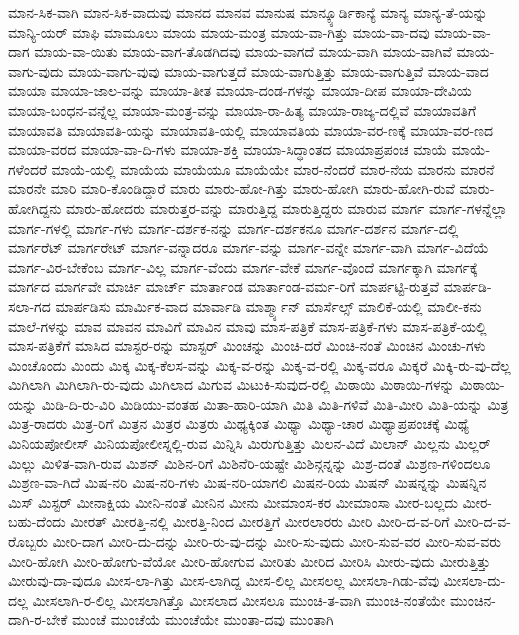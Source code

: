 {ಮಾನ-ಸಿಕ-ವಾಗಿ
ಮಾನ-ಸಿಕ-ವಾದುವು
ಮಾನದ
ಮಾನವ
ಮಾನುಷ
ಮಾನ್ಕ್ಯೂರ್ಡಿಕಾನ್ಯೆ
ಮಾನ್ಯ
ಮಾನ್ಯ-ತೆ-ಯನ್ನು
ಮಾನ್ಯಿ-ಯರ್
ಮಾಫಿ
ಮಾಮೂಲು
ಮಾಯ
ಮಾಯ-ಮಂತ್ರ
ಮಾಯ-ವಾ-ಗಿತ್ತು
ಮಾಯ-ವಾ-ದವು
ಮಾಯ-ವಾ-ದಾಗ
ಮಾಯ-ವಾ-ಯಿತು
ಮಾಯ-ವಾಗ-ತೊಡಗಿದವು
ಮಾಯ-ವಾಗದೆ
ಮಾಯ-ವಾಗಿ
ಮಾಯ-ವಾಗಿವೆ
ಮಾಯ-ವಾಗು-ವುದು
ಮಾಯ-ವಾಗು-ವುವು
ಮಾಯ-ವಾಗುತ್ತದೆ
ಮಾಯ-ವಾಗುತ್ತಿತ್ತು
ಮಾಯ-ವಾಗುತ್ತಿವೆ
ಮಾಯ-ವಾದ
ಮಾಯಾ
ಮಾಯಾ-ಜಾಲ-ವನ್ನು
ಮಾಯಾ-ತೀತ
ಮಾಯಾ-ದಂಡ-ಗಳನ್ನು
ಮಾಯಾ-ದೀಪ
ಮಾಯಾ-ದೇವಿಯ
ಮಾಯಾ-ಬಂಧನ-ವನ್ನೆಲ್ಲ
ಮಾಯಾ-ಮಂತ್ರ-ವನ್ನು
ಮಾಯಾ-ರಾ-ಹಿತ್ಯ
ಮಾಯಾ-ರಾಜ್ಯ-ದಲ್ಲಿವೆ
ಮಾಯಾವತಿಗೆ
ಮಾಯಾವತಿ
ಮಾಯಾವತಿ-ಯನ್ನು
ಮಾಯಾವತಿ-ಯಲ್ಲಿ
ಮಾಯಾವತಿಯ
ಮಾಯಾ-ವರ-ಣಕ್ಕೆ
ಮಾಯಾ-ವರ-ಣದ
ಮಾಯಾ-ವರದ
ಮಾಯಾ-ವಾ-ದಿ-ಗಳು
ಮಾಯಾ-ಶಕ್ತಿ
ಮಾಯಾ-ಸಿದ್ಧಾಂತದ
ಮಾಯಾಪ್ರಪಂಚ
ಮಾಯೆ
ಮಾಯೆ-ಗಳೆಂದರೆ
ಮಾಯೆ-ಯಲ್ಲಿ
ಮಾಯೆಯ
ಮಾಯೆಯೂ
ಮಾಯೆಯೇ
ಮಾರ-ನೆಂದರೆ
ಮಾರ-ನೆಯ
ಮಾರನು
ಮಾರನೆ
ಮಾರನೇ
ಮಾರಿ
ಮಾರಿ-ಕೊಂಡಿದ್ದಾರೆ
ಮಾರು
ಮಾರು-ಹೋ-ಗಿತ್ತು
ಮಾರು-ಹೋಗಿ
ಮಾರು-ಹೋಗಿ-ರುವೆ
ಮಾರು-ಹೋಗಿದ್ದನು
ಮಾರು-ಹೋದರು
ಮಾರುತ್ತರ-ವನ್ನು
ಮಾರುತ್ತಿದ್ದ
ಮಾರುತ್ತಿದ್ದರು
ಮಾರುವ
ಮಾರ್ಗ
ಮಾರ್ಗ-ಗಳನ್ನೆಲ್ಲಾ
ಮಾರ್ಗ-ಗಳಲ್ಲಿ
ಮಾರ್ಗ-ಗಳು
ಮಾರ್ಗ-ದರ್ಶಕ-ನನ್ನು
ಮಾರ್ಗ-ದರ್ಶಕನೂ
ಮಾರ್ಗ-ದರ್ಶನ
ಮಾರ್ಗ-ದಲ್ಲಿ
ಮಾರ್ಗರೆಟ್
ಮಾರ್ಗರೇಟ್
ಮಾರ್ಗ-ವನ್ನಾದರೂ
ಮಾರ್ಗ-ವನ್ನು
ಮಾರ್ಗ-ವನ್ನೇ
ಮಾರ್ಗ-ವಾಗಿ
ಮಾರ್ಗ-ವಿದೆಯೆ
ಮಾರ್ಗ-ವಿರ-ಬೇಕೆಂಬ
ಮಾರ್ಗ-ವಿಲ್ಲ
ಮಾರ್ಗ-ವೆಂದು
ಮಾರ್ಗ-ವೇಕೆ
ಮಾರ್ಗ-ವೊಂದೆ
ಮಾರ್ಗಕ್ಕಾಗಿ
ಮಾರ್ಗಕ್ಕೆ
ಮಾರ್ಗದ
ಮಾರ್ಗವೇ
ಮಾರ್ಚಿ
ಮಾರ್ಚ್
ಮಾರ್ತಾಂಡ
ಮಾರ್ತಾಂಡ-ವರ್ಮ-ರಿಗೆ
ಮಾರ್ಪಟ್ಟಿ-ರುತ್ತವೆ
ಮಾರ್ಪಡಿ-ಸಲಾ-ಗದ
ಮಾರ್ಪಡಿಸು
ಮಾರ್ಮಿಕ-ವಾದ
ಮಾರ್ವಾಡಿ
ಮಾರ್ಶ್ಮ್ಯಾನ್
ಮಾರ್ಸೆಲ್ಸ್
ಮಾಲಿಕೆ-ಯಲ್ಲಿ
ಮಾಲೀ-ಕನು
ಮಾಲೆ-ಗಳನ್ನು
ಮಾವ
ಮಾವನ
ಮಾವಿಗೆ
ಮಾವಿನ
ಮಾವು
ಮಾಸ-ಪತ್ರಿಕೆ
ಮಾಸ-ಪತ್ರಿಕೆ-ಗಳು
ಮಾಸ-ಪತ್ರಿಕೆ-ಯಲ್ಲಿ
ಮಾಸ-ಪತ್ರಿಕೆಗೆ
ಮಾಸಿದ
ಮಾಸ್ಟರ-ರನ್ನು
ಮಾಸ್ಟರ್
ಮಿಂಚನ್ನು
ಮಿಂಚಿ-ದರೆ
ಮಿಂಚಿ-ನಂತೆ
ಮಿಂಚಿನ
ಮಿಂಚು-ಗಳು
ಮಿಂಚೊಂದು
ಮಿಂದು
ಮಿಕ್ಕ
ಮಿಕ್ಕ-ಕೆಲಸ-ವನ್ನು
ಮಿಕ್ಕ-ವ-ರನ್ನು
ಮಿಕ್ಕ-ವ-ರಲ್ಲಿ
ಮಿಕ್ಕ-ವರೂ
ಮಿಕ್ಕರೆ
ಮಿಕ್ಕಿ-ರು-ವು-ದೆಲ್ಲ
ಮಿಗಿಲಾಗಿ
ಮಿಗಿಲಾಗಿ-ರು-ವುದು
ಮಿಗಿಲಾದ
ಮಿಗುವ
ಮಿಟುಕಿ-ಸುವುದ-ರಲ್ಲಿ
ಮಿಠಾಯಿ
ಮಿಠಾಯಿ-ಗಳನ್ನು
ಮಿಠಾಯಿ-ಯನ್ನು
ಮಿಡಿ-ದಿ-ರು-ವಿರಿ
ಮಿಡಿಯು-ವಂತಹ
ಮಿತಾ-ಹಾರಿ-ಯಾಗಿ
ಮಿತಿ
ಮಿತಿ-ಗಳಿವೆ
ಮಿತಿ-ಮೀರಿ
ಮಿತಿ-ಯನ್ನು
ಮಿತ್ರ
ಮಿತ್ರ-ರಾದರು
ಮಿತ್ರ-ರಿಗೆ
ಮಿತ್ರನ
ಮಿತ್ರರ
ಮಿತ್ರರು
ಮಿಥ್ಯಕ್ಕಿಂತ
ಮಿಥ್ಯಾ
ಮಿಥ್ಯಾ-ಚಾರ
ಮಿಥ್ಯಾಪ್ರಪಂಚಕ್ಕೆ
ಮಿಥ್ಯೆ
ಮಿನಿಯಪೋಲೀಸ್
ಮಿನಿಯಪೋಲೀಸ್ನಲ್ಲಿ-ರುವ
ಮಿನ್ನಿಸಿ
ಮಿರುಗುತ್ತಿತ್ತು
ಮಿಲನ-ವಿದೆ
ಮಿಲಾನ್
ಮಿಲ್ಲನು
ಮಿಲ್ಲರ್
ಮಿಲ್ಲು
ಮಿಳಿತ-ವಾಗಿ-ರುವ
ಮಿಶನ್
ಮಿಶಿನ-ರಿಗೆ
ಮಿಶಿನೆರಿ-ಯಷ್ಟೇ
ಮಿಶಿನ್ಗನ್ನನ್ನು
ಮಿಶ್ರ-ದಂತೆ
ಮಿಶ್ರಣ-ಗಳಿಂದಲೂ
ಮಿಶ್ರಣ-ವಾ-ಗಿದೆ
ಮಿಷ-ನರಿ
ಮಿಷ-ನರಿ-ಗಳು
ಮಿಷ-ನರಿ-ಯಾಗಲಿ
ಮಿಷನ-ರಿಯ
ಮಿಷನ್
ಮಿಷನ್ನನ್ನು
ಮಿಷನ್ನಿನ
ಮಿಸ್
ಮಿಸ್ಟರ್
ಮೀನಾಕ್ಷಿಯ
ಮೀನಿ-ನಂತೆ
ಮೀನಿನ
ಮೀನು
ಮೀಮಾಂಸ-ಕರ
ಮೀಮಾಂಸಾ
ಮೀರ-ಬಲ್ಲದು
ಮೀರ-ಬಹು-ದೆಂದು
ಮೀರತ್
ಮೀರತ್ತಿ-ನಲ್ಲಿ
ಮೀರತ್ತಿ-ನಿಂದ
ಮೀರತ್ತಿಗೆ
ಮೀರಲಾರರು
ಮೀರಿ
ಮೀರಿ-ದ-ವ-ರಿಗೆ
ಮೀರಿ-ದ-ವ-ರೊಬ್ಬರು
ಮೀರಿ-ದಾಗ
ಮೀರಿ-ದು-ದನ್ನು
ಮೀರಿ-ರು-ವು-ದನ್ನು
ಮೀರಿ-ಸು-ವುದು
ಮೀರಿ-ಸುವ-ವರ
ಮೀರಿ-ಸುವ-ವರು
ಮೀರಿ-ಹೋಗಿ
ಮೀರಿ-ಹೋಗು-ವೆಯೋ
ಮೀರಿ-ಹೋಗುವ
ಮೀರಿತು
ಮೀರಿದ
ಮೀರಿಸಿ
ಮೀರು-ವುದು
ಮೀರುತ್ತಿತ್ತು
ಮೀರುವು-ದಾ-ವುದೂ
ಮೀಸ-ಲಾ-ಗಿತ್ತು
ಮೀಸ-ಲಾಗಿದ್ದ
ಮೀಸ-ಲಿಲ್ಲ
ಮೀಸಲಲ್ಲ
ಮೀಸಲಾ-ಗಿಡು-ವೆವು
ಮೀಸಲಾ-ದು-ದಲ್ಲ
ಮೀಸಲಾಗಿ-ರ-ಲಿಲ್ಲ
ಮೀಸಲಾಗಿತ್ತೊ
ಮೀಸಲಾದ
ಮೀಸಲೂ
ಮುಂಚಿ-ತ-ವಾಗಿ
ಮುಂಚಿ-ನಂತೆಯೇ
ಮುಂಚಿನ-ದಾಗಿ-ರ-ಬೇಕೆ
ಮುಂಚೆ
ಮುಂಚೆಯೆ
ಮುಂಚೆಯೇ
ಮುಂತಾ-ದವು
ಮುಂತಾಗಿ
}
